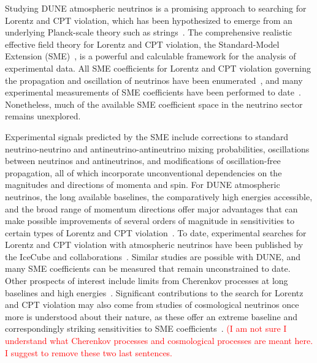 Studying DUNE atmospheric neutrinos is a promising approach
to searching for Lorentz and CPT violation,
which has been hypothesized
to emerge from an underlying Planck-scale theory such as strings~\cite{Kostelecky:1988zi,Kostelecky:1991ak}.
The comprehensive realistic effective field theory
for Lorentz and CPT violation,
the Standard-Model Extension (SME)~\cite{Kostelecky:1994rn,Colladay:1996iz,Colladay:1998fq,Kostelecky:2003fs},
is a powerful and calculable framework
for the analysis of experimental data.
All SME coefficients for Lorentz and CPT violation
governing the propagation and oscillation of neutrinos
have been enumerated~\cite{Kostelecky:2003cr,Kostelecky:2011gq},
and many experimental measurements of SME coefficients 
have been performed to date~\cite{Kostelecky:2008ts}.
Nonetheless,
much of the available SME coefficient space 
in the neutrino sector remains unexplored.

Experimental signals predicted by the SME include
corrections to standard neutrino-neutrino 
and antineutrino-antineutrino mixing probabilities,
oscillations between neutrinos and antineutrinos,
and modifications of oscillation-free propagation,
all of which incorporate unconventional dependencies
on the magnitudes and directions of momenta and spin.
For DUNE atmospheric neutrinos,
the long available baselines,
the comparatively high energies accessible,
and the broad range of momentum directions
offer major advantages that can make possible 
improvements of several orders of magnitude
in sensitivities to certain types of Lorentz and CPT violation~\cite{Kostelecky:2003cr,Kostelecky:2011gq,Kostelecky:2003xn,Kostelecky:2004hg,Diaz:2009qk,Diaz:2013saa,Diaz:2013wia}.
To date,
experimental searches for Lorentz and CPT violation
with atmospheric neutrinos have been published 
by the IceCube and \superk collaborations~\cite{Abbasi:2010kx,Abe:2014wla,Aartsen:2017ibm}.
Similar studies are possible with DUNE,
and many SME coefficients can be measured that remain unconstrained to date.
Other prospects of interest include limits from Cherenkov processes
at long baselines and high energies~\cite{Kostelecky:2011gq}.
Significant contributions to the search 
for Lorentz and CPT violation may also 
come from studies of cosmological neutrinos
once more is understood about their nature,
as these offer an extreme baseline
and correspondingly striking sensitivities
to SME coefficients~\cite{Diaz:2013wia}.
\textcolor{red}{(I am not sure I understand what Cherenkov processes and cosmological processes are meant here. I suggest to remove these two last sentences.}

